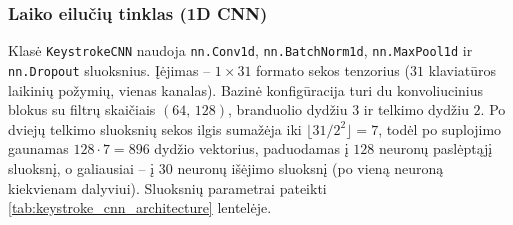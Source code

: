 \subsubsection{Laiko eilučių tinklas (1D CNN)}
\label{subsubsec:keystroke_cnn}

Klasė \texttt{KeystrokeCNN} naudoja \texttt{nn.Conv1d}, \texttt{nn.BatchNorm1d}, \texttt{nn.MaxPool1d} ir \texttt{nn.Dropout} sluoksnius. Įėjimas – $1 \times 31$ formato sekos tenzorius ($31$ klaviatūros laikinių požymių, vienas kanalas). Bazinė konfigūracija turi du konvoliucinius blokus su filtrų skaičiais $(64,\,128)$, branduolio dydžiu $3$ ir telkimo dydžiu $2$. Po dviejų telkimo sluoksnių sekos ilgis sumažėja iki $\lfloor 31 / 2^{2} \rfloor = 7$, todėl po suplojimo gaunamas $128 \cdot 7 = 896$ dydžio vektorius, paduodamas į $128$ neuronų paslėptąjį sluoksnį, o galiausiai – į $30$ neuronų išėjimo sluoksnį (po vieną neuroną kiekvienam dalyviui). Sluoksnių parametrai pateikti \ref{tab:keystroke_cnn_architecture} lentelėje.


